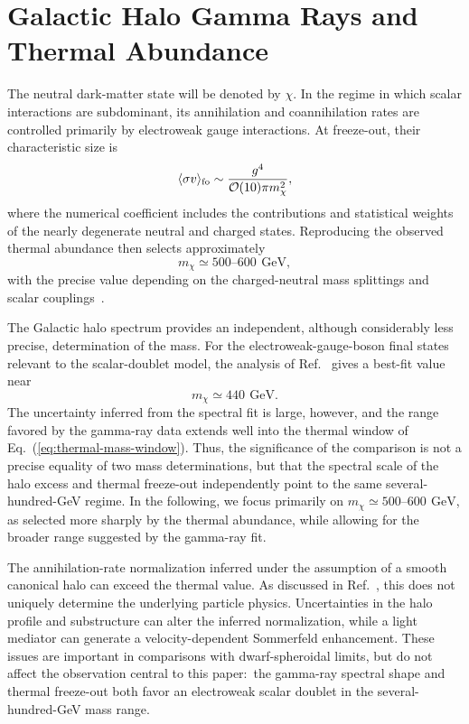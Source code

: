 \documentclass[aps,prd,twocolumn,nofootinbib,superscriptaddress]{revtex4-2}
\newcommand{\GeV}{\,\mathrm{GeV}}
\begin{document}
\section{Galactic Halo Gamma Rays and Thermal Abundance}

The neutral dark-matter state will be denoted by $\chi$. In the regime in which scalar interactions are subdominant, its annihilation and coannihilation rates are controlled primarily by electroweak gauge interactions. At freeze-out, their characteristic size is
%
\begin{equation}
  \langle \sigma v\rangle_{\rm fo} \sim \frac{g^4}{{\cal O}(10)\pi m_\chi^2},
\end{equation}
%
where the numerical coefficient includes the contributions and statistical weights of the nearly degenerate neutral and charged states. Reproducing the observed thermal abundance then selects approximately
%
\begin{equation}
  m_\chi \simeq 500\text{--}600~\GeV,
\label{eq:thermal-mass-window}
\end{equation}
%
with the precise value depending on the charged-neutral mass splittings and scalar couplings~\cite{Banerjee:2019luv,Nomura:2026ntp}.

The Galactic halo spectrum provides an independent, although considerably less precise, determination of the mass. For the electroweak-gauge-boson final states relevant to the scalar-doublet model, the analysis of Ref.~\cite{Nomura:2026ntp} gives a best-fit value near
%
\begin{equation}
  m_\chi \simeq 440~\GeV.
\label{eq:halo-best-fit}
\end{equation}
%
The uncertainty inferred from the spectral fit is large, however, and the range favored by the gamma-ray data extends well into the thermal window of Eq.~(\ref{eq:thermal-mass-window}). Thus, the significance of the comparison is not a precise equality of two mass determinations, but that the spectral scale of the halo excess and thermal freeze-out independently point to the same several-hundred-GeV regime. In the following, we focus primarily on $m_\chi \simeq 500$--$600~\GeV$, as selected more sharply by the thermal abundance, while allowing for the broader range suggested by the gamma-ray fit.

The annihilation-rate normalization inferred under the assumption of a smooth canonical halo can exceed the thermal value. As discussed in Ref.~\cite{Nomura:2026ntp}, this does not uniquely determine the underlying particle physics. Uncertainties in the halo profile and substructure can alter the inferred normalization, while a light mediator can generate a velocity-dependent Sommerfeld enhancement. These issues are important in comparisons with dwarf-spheroidal limits, but do not affect the observation central to this paper:\ the gamma-ray spectral shape and thermal freeze-out both favor an electroweak scalar doublet in the several-hundred-GeV mass range.
\end{document}

